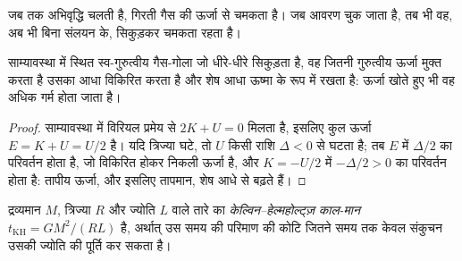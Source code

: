 \begin{omfigure}
\par{}
\end{omfigure}

जब तक अभिवृद्धि चलती है,  गिरती गैस की ऊर्जा से चमकता है। जब
आवरण चुक जाता है, तब भी वह, अब भी बिना संलयन के,
सिकुड़कर चमकता रहता है।

\begin{proposition}[संकुचन युवा तारे को ऊर्जा देता है]
\label{prop:b2:ism-star-formation:contraction}
साम्यावस्था में स्थित स्व-गुरुत्वीय गैस-गोला जो धीरे-धीरे सिकुड़ता है, वह जितनी गुरुत्वीय ऊर्जा
मुक्त करता है उसका आधा विकिरित करता है और शेष आधा ऊष्मा के रूप में रखता है:
ऊर्जा खोते हुए भी वह अधिक गर्म होता जाता है।
\end{proposition}

\begin{proof}
साम्यावस्था में विरियल प्रमेय से $2K + U = 0$ मिलता है, इसलिए कुल ऊर्जा
$E = K + U = U/2$ है। यदि त्रिज्या घटे, तो $U$ किसी राशि
$\Delta < 0$ से घटता है; तब $E$ में $\Delta/2$ का परिवर्तन होता है, जो विकिरित होकर निकली
ऊर्जा है, और $K = -U/2$ में $-\Delta/2 > 0$ का परिवर्तन होता है: तापीय ऊर्जा, और इसलिए
तापमान, शेष आधे से बढ़ते हैं।
\end{proof}

\begin{definition}[केल्विन--हेल्महोल्ट्ज़ काल-मान]\label{def:b2:ism-star-formation:kh-time}
द्रव्यमान $M$, त्रिज्या $R$ और ज्योति $L$ वाले तारे का
\emph{केल्विन--हेल्महोल्ट्ज़ काल-मान}
$t_{\mathrm{KH}} = GM^2/(RL)$ है, अर्थात् उस समय की परिमाण की कोटि जितने समय तक
केवल संकुचन उसकी ज्योति की पूर्ति कर सकता है।
\end{definition}

